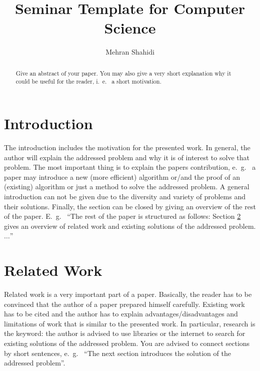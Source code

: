 \documentclass[]{rptuseminar}
\title{Seminar Template for Computer Science}
\author{Mehran Shahidi
  \institute{Technische Universität Kaiserslautern, Department of Computer Science}}
\begin{document}

\maketitle


\begin{abstract}
    Give an abstract of your paper. You may also give a very short explanation why it could be useful for the reader, i.~e.~ a short motivation.
\end{abstract}


\section{Introduction}
\label{sec:introduction}

The introduction includes the motivation for the presented work.
In general, the author will explain the addressed problem and why it is of interest to solve that problem.
The most important thing is to explain the papers contribution, e.~g.~ a paper may introduce a new (more efficient) algorithm or/and the proof of an (existing) algorithm or just a method to solve the addressed problem.
A general introduction can not be given due to the diversity and variety of problems and their solutions.
Finally, the section can be closed by giving an overview of the rest of the paper.
E.~g.~ ``The rest of the paper is structured as follows:
Section \ref{sec:relatedwork} gives an overview of related work and existing solutions of the addressed problem. $\ldots$''

\section{Related Work}
\label{sec:relatedwork}

Related work is a very important part of a paper.
Basically, the reader has to be convinced that the author of a paper prepared himself carefully.
Existing work has to be cited and the author has to explain advantages/disadvantages and limitations of work that is similar to the presented work.
In particular, research is the keyword: the author is advised to use libraries or the internet to search for existing solutions of the addressed problem.
You are advised to connect sections by short sentences, e.~g.~ ``The next section introduces the solution of the addressed problem''.
\end{document}
